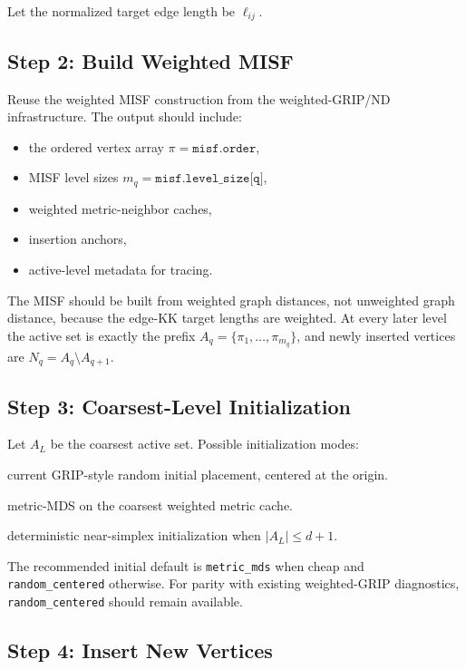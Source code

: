 \documentclass[11pt]{article}
\begin{document}
Let the normalized target edge length be \(\ell_{ij}\).

\subsection{Step 2: Build Weighted MISF}

Reuse the weighted MISF construction from the weighted-GRIP/ND infrastructure.
The output should include:
\begin{itemize}[leftmargin=2em]
  \item the ordered vertex array \(\pi=\texttt{misf.order}\),
  \item MISF level sizes \(m_q=\texttt{misf.level\_size[q]}\),
  \item weighted metric-neighbor caches,
  \item insertion anchors,
  \item active-level metadata for tracing.
\end{itemize}

The MISF should be built from weighted graph distances, not unweighted graph
distance, because the edge-KK target lengths are weighted. At every later level
the active set is exactly the prefix \(A_q=\{\pi_1,\ldots,\pi_{m_q}\}\), and
newly inserted vertices are \(N_q=A_q\setminus A_{q+1}\).

\subsection{Step 3: Coarsest-Level Initialization}

Let \(A_L\) be the coarsest active set.
Possible initialization modes:
\begin{description}[leftmargin=2em]
  \item[\texttt{random\_centered}] current GRIP-style random initial placement,
  centered at the origin.
  \item[\texttt{metric\_mds}] metric-MDS on the coarsest weighted metric cache.
  \item[\texttt{simplex}] deterministic near-simplex initialization when
  \(|A_L|\le d+1\).
\end{description}

The recommended initial default is \texttt{metric\_mds} when cheap and
\texttt{random\_centered} otherwise. For parity with existing weighted-GRIP
diagnostics, \texttt{random\_centered} should remain available.

\subsection{Step 4: Insert New Vertices}
\end{document}
